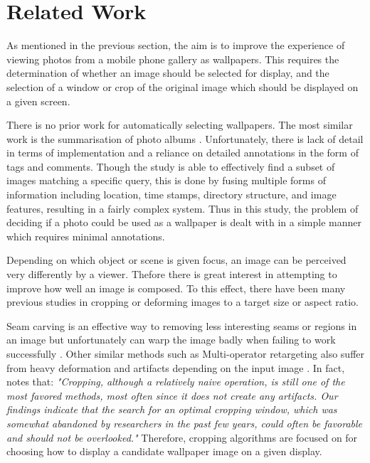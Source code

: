 %
\newpage
\chapter{Related Work}

As mentioned in the previous section, the aim is to improve the experience of
viewing photos from a mobile phone gallery as wallpapers.
This requires the determination of whether an image should be selected for
display, and the selection of a window or crop of the original image which
should be displayed on a given screen.

There is no prior work for automatically selecting wallpapers.
The most similar work is the summarisation of photo albums \cite{sinha2009personal}.
Unfortunately, there is lack of detail in terms of implementation and a reliance on detailed annotations in the form of tags and comments.
Though the study is able to effectively find a subset of images matching a specific query, this is done by fusing multiple forms of information including location, time stamps, directory structure, and image features, resulting in a fairly complex system.
Thus in this study, the problem of deciding if a photo could be used as a wallpaper is dealt with in a simple manner which requires minimal annotations.

Depending on which object or scene is given focus, an image can be perceived
very differently by a viewer.
Thefore there is great interest in attempting to improve how well an image is
composed.
To this effect, there have been many previous studies in cropping or deforming
images to a target size or aspect ratio.

Seam carving is an effective way to removing less
interesting seams or regions in an image but unfortunately can warp the image
badly when failing to work successfully \cite{avidan2007seam}.
Other similar methods such as Multi-operator retargeting also suffer from
heavy deformation and artifacts depending on the input image \cite{rubinstein2009multi}.
In fact, \cite{rubinstein2010comparative} notes that:
\emph{"Cropping, although a relatively naive operation, is still one of the most
	favored methods, most often since it does not create any artifacts. Our
	findings indicate that the search for an optimal cropping window, which
	was somewhat abandoned by researchers in the past few years, could often
	be favorable and should not be overlooked."}
Therefore, cropping algorithms are focused on for choosing how to display a
candidate wallpaper image on a given display.

